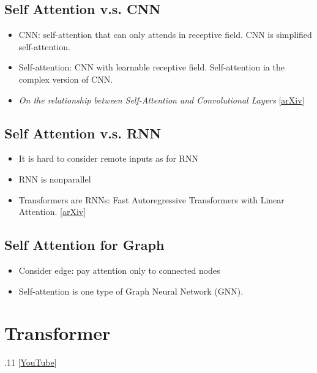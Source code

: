\documentclass[11pt]{book}
\begin{document}
\section{Self Attention v.s. CNN}
\begin{itemize}
    \item CNN: self-attention that can only attends in receptive field. CNN is simplified self-attention.
    \item Self-attention: CNN with learnable receptive field. Self-attention ia the complex version of CNN.
    \item \textit{On the relationship between Self-Attention and Convolutional Layers} [\href{https://arxiv.org/abs/1911.03584}{arXiv}]
\end{itemize}

\section{Self Attention v.s. RNN}
\begin{itemize}
    \item It is hard to consider remote inputs as for RNN
    \item RNN is nonparallel
    \item Transformers are RNNs: Fast Autoregressive Transformers with Linear Attention. [\href{https://arxiv.org/abs/2006.16236}{arXiv}]
\end{itemize}

\section{Self Attention for Graph}
\begin{itemize}
    \item Consider edge: pay attention only to connected nodes
    \item Self-attention is one type of Graph Neural Network (GNN).
\end{itemize}

\chapter{Transformer}
.11 [\href{https://www.youtube.com/watch?v=n9TlOhRjYoc&list=PLJV_el3uVTsMhtt7_Y6sgTHGHp1Vb2P2J&index=12}{YouTube}]
\end{document}
